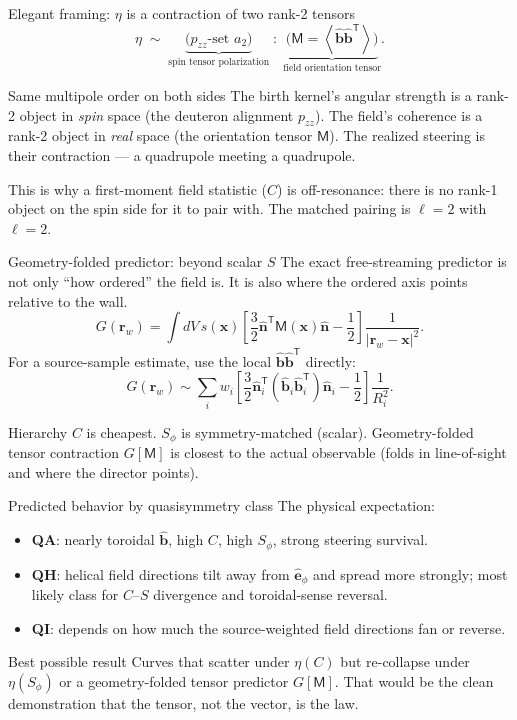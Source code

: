 \documentclass[aspectratio=169]{beamer}
\newcommand{\bn}{\hat{\bm n}}
\newcommand{\bb}{\hat{\bm b}}
\newcommand{\bx}{\bm x}
\newcommand{\brw}{\bm r_w}
\newcommand{\T}{\mathsf T}
\newcommand{\avg}[1]{\left\langle #1 \right\rangle}
\newcommand{\M}{\mathsf M}
\newcommand{\ephi}{\hat{\bm e}_\phi}
\newcommand{\Sphi}{S_\phi}
\begin{document}
\begin{frame}[t]{Elegant framing: $\eta$ is a contraction of two rank-2 tensors}
\[
\eta \;\sim\;
\underbrace{\big(p_{zz}\text{-set } a_2\big)}_{\text{spin tensor polarization}}
\;:\;
\underbrace{\big(\M=\avg{\bb\bb^\T}\big)}_{\text{field orientation tensor}} .
\]
\begin{block}{Same multipole order on both sides}
The birth kernel's angular strength is a rank-2 object in \emph{spin} space (the deuteron alignment $p_{zz}$). The field's coherence is a rank-2 object in \emph{real} space (the orientation tensor $\M$). The realized steering is their contraction --- a quadrupole meeting a quadrupole.
\end{block}
This is why a first-moment field statistic ($C$) is off-resonance: there is no rank-1 object on the spin side for it to pair with. The matched pairing is $\ell=2$ with $\ell=2$.
\end{frame}

\begin{frame}[t]{Geometry-folded predictor: beyond scalar $S$}
The exact free-streaming predictor is not only ``how ordered'' the field is. It is also where the ordered axis points relative to the wall.
\[
G(\brw) = \int dV\,s(\bx)
\left[\frac{3}{2}\bn^\T\M(\bx)\bn-\frac{1}{2}\right]
\frac{1}{|\brw-\bx|^2}.
\]
For a source-sample estimate, use the local $\bb\bb^\T$ directly:
\[
G(\brw) \sim \sum_i w_i
\left[\frac{3}{2}\bn_i^\T(\bb_i\bb_i^\T)\bn_i-\frac{1}{2}\right]
\frac{1}{R_i^2}.
\]
\begin{block}{Hierarchy}
$C$ is cheapest. $\Sphi$ is symmetry-matched (scalar). Geometry-folded tensor contraction $G[\M]$ is closest to the actual observable (folds in line-of-sight and where the director points).
\end{block}
\end{frame}

\begin{frame}[t]{Predicted behavior by quasisymmetry class}
The physical expectation:
\begin{itemize}
  \item \textbf{QA}: nearly toroidal $\bb$, high $C$, high $\Sphi$, strong steering survival.
  \item \textbf{QH}: helical field directions tilt away from $\ephi$ and spread more strongly; most likely class for $C$--$S$ divergence and toroidal-sense reversal.
  \item \textbf{QI}: depends on how much the source-weighted field directions fan or reverse.
\end{itemize}
\vspace{0.5em}
\begin{block}{Best possible result}
Curves that scatter under $\eta(C)$ but re-collapse under $\eta(\Sphi)$ or a geometry-folded tensor predictor $G[\M]$. That would be the clean demonstration that the tensor, not the vector, is the law.
\end{block}
\end{frame}
\end{document}
